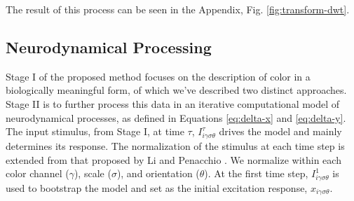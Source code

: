 \documentclass[journal,onecolumn]{IEEEtran}
\begin{document}
The result of this process can be seen in the Appendix, Fig. \ref{fig:transform-dwt}.


\subsection*{Neurodynamical Processing}

Stage I of the proposed method focuses on the description of color in a biologically meaningful form, of which we've described two distinct approaches. Stage II is to further process this data in an iterative computational model of neurodynamical processes, as defined in Equations \ref{eq:delta-x} and \ref{eq:delta-y}. The input stimulus, from Stage I, at time $\tau$, $I^\tau_{i\gamma\sigma\theta}$ drives the model and mainly determines its response. The normalization of the stimulus at each time step is extended from that proposed by Li \cite{li:1999} and Penacchio \cite{penacchio:2013}. We normalize within each color channel ($\gamma$), scale ($\sigma$), and orientation ($\theta$). At the first time step, $I^1_{i\gamma\sigma\theta}$ is used to bootstrap the model and set as the initial excitation response, $x_{i\gamma\sigma\theta}$.
\end{document}
